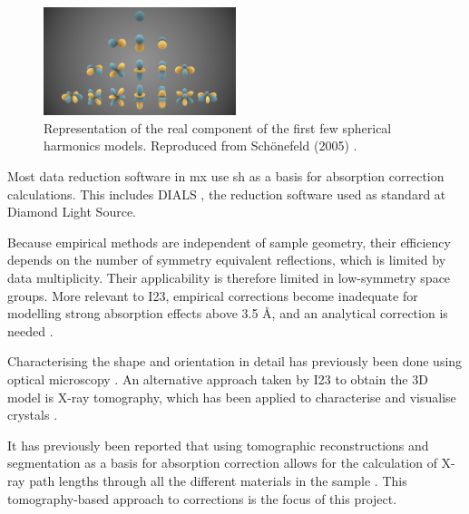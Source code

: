 \begin{figure}
    \centering
    \includegraphics[trim={3cm 0 3cm 0},clip,width = 0.5\textwidth]{images/Spherical_Harmonics.png}
    \caption{Representation of the real component of the first few spherical harmonics models. Reproduced from Schönefeld (2005) \cite{Schoenefeld2005}.}
    \label{fig:SH}
\end{figure}

Most data reduction software in \ac{mx} use \ac{sh} as a basis for absorption correction calculations. This includes DIALS \cite{Winter2018}, the reduction software used as standard at Diamond Light Source.

Because empirical methods are independent of sample geometry, their efficiency depends on the number of symmetry equivalent reflections, which is limited by data multiplicity. Their applicability is therefore limited in low-symmetry space groups. More relevant to I23, empirical corrections become inadequate for modelling strong absorption effects above 3.5 Å, and an analytical correction is needed \cite{Kazantsev2021}.

Characterising the shape and orientation in detail has previously been done using optical microscopy \cite{Leal2008, Strutz2011}. %
An alternative approach taken by I23 to obtain the 3D model is X-ray tomography, which has been applied to characterise and visualise crystals \cite{Merrifield2011, Warren2013}.%

 It has previously been reported that using tomographic reconstructions and segmentation as a basis for absorption correction allows for the calculation of X-ray path lengths through all the different materials in the sample \cite{Brockhauser2008}. This tomography-based approach to corrections is the focus of this project.

